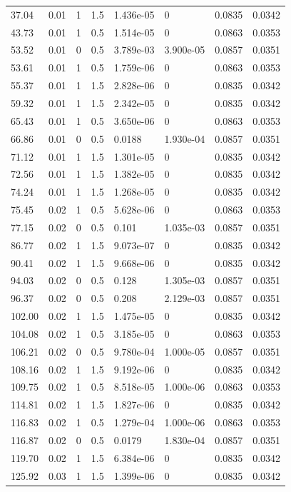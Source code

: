 \documentclass[preview]{standalone}
\begin{document}
{{\begin{tabular}{L{1.2cm}C{1.2cm} C{0.3cm}C{0.5cm} C{1.4cm}C{1.4cm} C{1.4cm}C{1.4cm}}
  37.04  &  0.01  & 1     & 1.5 &  1.436e-05  & 0  & 0.0835 &  0.0342   \\ 
  43.73  &  0.01  & 1     & 0.5 &  1.514e-05  & 0  & 0.0863 &  0.0353   \\ 
  53.52  &  0.01  & 0     & 0.5 &  3.789e-03  & 3.900e-05  & 0.0857 &  0.0351   \\ 
  53.61  &  0.01  & 1     & 0.5 &  1.759e-06  & 0  & 0.0863 &  0.0353   \\ 
  55.37  &  0.01  & 1     & 1.5 &  2.828e-06  & 0  & 0.0835 &  0.0342   \\ 
  59.32  &  0.01  & 1     & 1.5 &  2.342e-05  & 0  & 0.0835 &  0.0342   \\ 
  65.43  &  0.01  & 1     & 0.5 &  3.650e-06  & 0  & 0.0863 &  0.0353   \\ 
  66.86  &  0.01  & 0     & 0.5 &  0.0188  & 1.930e-04  & 0.0857 &  0.0351   \\ 
  71.12  &  0.01  & 1     & 1.5 &  1.301e-05  & 0  & 0.0835 &  0.0342   \\ 
  72.56  &  0.01  & 1     & 1.5 &  1.382e-05  & 0  & 0.0835 &  0.0342   \\ 
  74.24  &  0.01  & 1     & 1.5 &  1.268e-05  & 0  & 0.0835 &  0.0342   \\ 
  75.45  &  0.02  & 1     & 0.5 &  5.628e-06  & 0  & 0.0863 &  0.0353   \\ 
  77.15  &  0.02  & 0     & 0.5 &  0.101  & 1.035e-03  & 0.0857 &  0.0351   \\ 
  86.77  &  0.02  & 1     & 1.5 &  9.073e-07  & 0  & 0.0835 &  0.0342   \\ 
  90.41  &  0.02  & 1     & 1.5 &  9.668e-06  & 0  & 0.0835 &  0.0342   \\ 
  94.03  &  0.02  & 0     & 0.5 &  0.128  & 1.305e-03  & 0.0857 &  0.0351   \\ 
  96.37  &  0.02  & 0     & 0.5 &  0.208  & 2.129e-03  & 0.0857 &  0.0351   \\ 
  102.00  &  0.02  & 1     & 1.5 &  1.475e-05  & 0  & 0.0835 &  0.0342   \\ 
  104.08  &  0.02  & 1     & 0.5 &  3.185e-05  & 0  & 0.0863 &  0.0353   \\ 
  106.21  &  0.02  & 0     & 0.5 &  9.780e-04  & 1.000e-05  & 0.0857 &  0.0351   \\ 
  108.16  &  0.02  & 1     & 1.5 &  9.192e-06  & 0  & 0.0835 &  0.0342   \\ 
  109.75  &  0.02  & 1     & 0.5 &  8.518e-05  & 1.000e-06  & 0.0863 &  0.0353   \\ 
  114.81  &  0.02  & 1     & 1.5 &  1.827e-06  & 0  & 0.0835 &  0.0342   \\ 
  116.83  &  0.02  & 1     & 0.5 &  1.279e-04  & 1.000e-06  & 0.0863 &  0.0353   \\ 
  116.87  &  0.02  & 0     & 0.5 &  0.0179  & 1.830e-04  & 0.0857 &  0.0351   \\ 
  119.70  &  0.02  & 1     & 1.5 &  6.384e-06  & 0  & 0.0835 &  0.0342   \\ 
  125.92  &  0.03  & 1     & 1.5 &  1.399e-06  & 0  & 0.0835 &  0.0342   \\ 
\hline 
\end{tabular} 

}}
\end{document}

